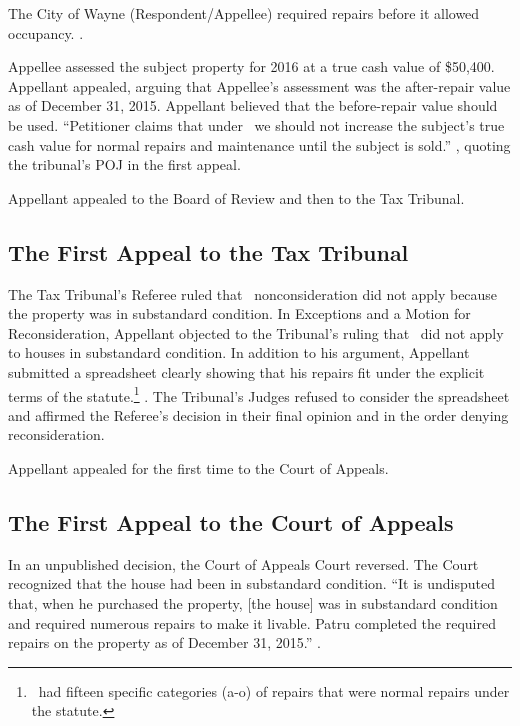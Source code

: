 \documentclass[12pt,\documentclassflag]{michiganCourtOfAppealsBrief}
\begin{document}
The City of Wayne (Respondent/Appellee) required repairs before it allowed occupancy. %
\repairs.

Appellee assessed the subject property for 2016 at a true cash value of \$50,400. Appellant appealed, arguing that Appellee's assessment was the after-repair value as of December 31, 2015.
Appellant believed that the before-repair value should be used. 
``Petitioner claims that under \mathieuGast\ we should not increase the subject's true cash value for normal repairs and maintenance until the subject is sold.'' , quoting the tribunal's POJ in the first appeal.

Appellant appealed to the Board of Review and then to the Tax Tribunal.

\subsection{The First Appeal to the Tax Tribunal}

The Tax Tribunal's Referee ruled that \mathieuGast\ nonconsideration did not apply because the property was in substandard condition.
In Exceptions and a Motion for Reconsideration, Appellant objected to the Tribunal's ruling that \mathieuGast\ did not apply to houses in substandard condition. In addition to his argument, Appellant submitted a spreadsheet clearly showing that his repairs fit under the explicit terms of the statute.\footnote{\mathieuGast\ had fifteen specific categories (a-o) of repairs that were normal repairs under the statute.} \repairs. The Tribunal's Judges refused to consider the spreadsheet and affirmed the Referee's decision in their final opinion and in the order denying reconsideration. 

Appellant appealed for the first time to the Court of Appeals.

\subsection{The First Appeal to the Court of Appeals}

In an unpublished decision, the Court of Appeals Court reversed. The Court recognized that the house had been in substandard condition. ``It is undisputed that, when he purchased the property, [the house] was in substandard condition and required numerous repairs to make it livable. Patru completed the required repairs on the property as of December 31, 2015.''
.
\end{document}

